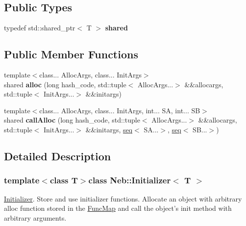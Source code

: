 \subsection*{Public Types}
\begin{DoxyCompactItemize}
\item 
\hypertarget{classNeb_1_1Initializer_a50e05ce7fe54c798cd00495214bf2df4}{typedef std\-::shared\-\_\-ptr$<$ T $>$ {\bfseries shared}}\label{classNeb_1_1Initializer_a50e05ce7fe54c798cd00495214bf2df4}

\end{DoxyCompactItemize}
\subsection*{Public Member Functions}
\begin{DoxyCompactItemize}
\item 
\hypertarget{classNeb_1_1Initializer_aa6c409694511459956b7cfbc27feb8fc}{{\footnotesize template$<$class... Alloc\-Args, class... Init\-Args$>$ }\\shared {\bfseries alloc} (long hash\-\_\-code, std\-::tuple$<$ Alloc\-Args...$>$ \&\&allocargs, std\-::tuple$<$ Init\-Args...$>$ \&\&initargs)}\label{classNeb_1_1Initializer_aa6c409694511459956b7cfbc27feb8fc}

\item 
\hypertarget{classNeb_1_1Initializer_ad30f8a193fa13c284fd20cd516ed0b78}{{\footnotesize template$<$class... Alloc\-Args, class... Init\-Args, int... S\-A, int... S\-B$>$ }\\shared {\bfseries call\-Alloc} (long hash\-\_\-code, std\-::tuple$<$ Alloc\-Args...$>$ \&\&allocargs, std\-::tuple$<$ Init\-Args...$>$ \&\&initargs, \hyperlink{structseq}{seq}$<$ S\-A...$>$, \hyperlink{structseq}{seq}$<$ S\-B...$>$)}\label{classNeb_1_1Initializer_ad30f8a193fa13c284fd20cd516ed0b78}

\end{DoxyCompactItemize}


\subsection{Detailed Description}
\subsubsection*{template$<$class T$>$class Neb\-::\-Initializer$<$ T $>$}

\hyperlink{classNeb_1_1Initializer}{Initializer}. Store and use initializer functions. Allocate an object with arbitrary alloc function stored in the \hyperlink{classNeb_1_1FuncMap}{Func\-Map} and call the object's {\ttfamily init} method with arbitrary arguments. 

